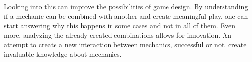 Looking into this can improve the possibilities of game design. By understanding if a mechanic can be combined with another and create meaningful play, one can start answering why this happens in some cases and not in all of them. Even more, analyzing the already created combinations allows for innovation. An attempt to create a new interaction between mechanics, successful or not, create invaluable knowledge about mechanics.